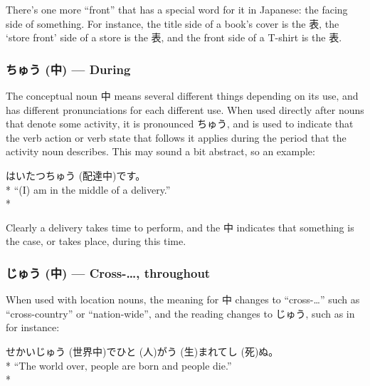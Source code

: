 \documentclass[11pt, b5paper, twoside, openright, onecolumn]{book}
\makeatletter
\newcommand*{\rubystack}[2]{{\relscale{0.5}%
  \begin{tabular}[b]{@{}c@{}}%
    {#1}\\%
   {\textscale{2}{#2}}%
  \end{tabular}}%
}
\DeclareRobustCommand*{\ruby}[2]{%
  \mbox{%
    \setlength{\parskip}{0ex}%
    \BeginAccSupp{method=pdfstringdef,ActualText={#1}}%
      \rubystack{\phantom{#2}}{#1}%
      \llap{%
        \rubystack{#2}{\phantom{#1}}%
      }%
    \EndAccSupp{}%
  }%
}
\renewcommand*{\ruby}[2]{#2 (#1)}%
\newenvironment{exampleblock}{
\setlength{\parindent}{0.6in}
\begin{minipage}[t]{\dimexpr\textwidth-\parindent}}
{\end{minipage}}
\makeatother
\begin{document}
There’s one more “front” that has a special word for it in Japanese: the facing side of something. For instance‚ the title side of a book’s cover is the 表‚ the ‘store front’ side of a store is the 表‚ and the front side of a T-shirt is the 表.

\subsubsection{\ruby{中}{ちゅう} — During}

The conceptual noun 中 means several different things depending on its use‚ and has different pronunciations for each different use. When used directly after nouns that denote some activity‚ it is pronounced ちゅう‚ and is used to indicate that the verb action or verb state that follows it applies during the period that the activity noun describes. This may sound a bit abstract‚ so an example:

\vspace{0.4cm}
\begin{exampleblock}
\ruby{配達中}{はいたつちゅう}です。 \\* 
“(I) am in the middle of a delivery.” \\* 
\end{exampleblock}
\vspace{0.2cm}

Clearly a delivery takes time to perform‚ and the 中 indicates that something is the case‚ or takes place‚ during this time.

\subsubsection{\ruby{中}{じゅう} — Cross-…‚ throughout}

When used with location nouns‚ the meaning for 中 changes to “cross-…” such as “cross-country” or “nation-wide”‚ and the reading changes to じゅう‚ such as in for instance:

\vspace{0.4cm}
\begin{exampleblock}
\ruby{世界中}{せかいじゅう}で\ruby{人}{ひと}が\ruby{生}{う}まれて\ruby{死}{し}ぬ。 \\* 
“The world over‚ people are born and people die.” \\* 
\end{exampleblock}
\end{document}
